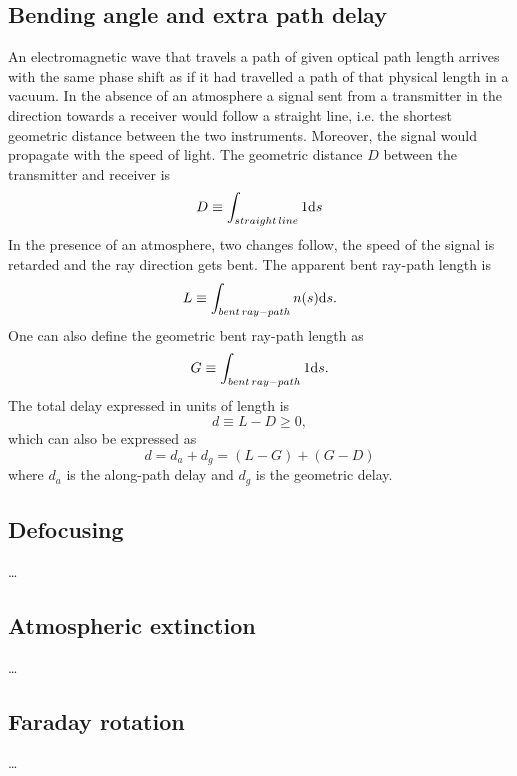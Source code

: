 \subsection{Bending angle and extra path delay}
%
An electromagnetic wave that travels a path of given optical path 
length arrives with the same phase shift as if it had travelled a 
path of that physical length in a vacuum. 
In the absence of an atmosphere a signal
sent from a transmitter in the direction towards a receiver would
follow a straight line, i.e. the shortest geometric distance
between the two instruments. Moreover, the signal would propagate
with the speed of light.
The geometric distance \(D\) between the transmitter and receiver is
\begin{equation}
D\equiv\int_{straight\,line}1\mathrm{d} s
\end{equation}
In the presence of an atmosphere, two changes follow,
the speed of the signal is retarded and the ray direction gets 
bent. 
The apparent bent ray-path length is
\begin{equation}
L\equiv\int_{bent\,ray-path}n(s)\mathrm{d} s.
\end{equation}
One can also define the geometric bent ray-path length as
\begin{equation}
G\equiv\int_{bent\,ray-path}1\mathrm{d} s.
\end{equation}
The total delay expressed in units of length is 
\begin{equation}
d \equiv L-D \ge 0,
\end{equation}
which can also be expressed as
\begin{equation} 
d=d_{a}+d_{g}=(L-G)+(G-D)
\end{equation}
where \(d_{a}\) is the along-path delay
and \(d_{g}\) is the geometric delay.



\subsection{Defocusing}
\label{sec:rlink:defoc}
%
\dots



\subsection{Atmospheric extinction}
\label{sec:rlink:atmext}
%
\dots



\subsection{Faraday rotation}
\label{sec:rlink:farrot}
%
\dots

